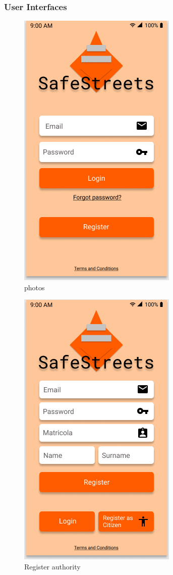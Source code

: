 \documentclass{article}
\begin{document}
\subsubsection{User Interfaces}
\begin{figure}[h!]
    \centering
    \includegraphics[scale=0.5]{img/mockups/login.png}
    \caption{photos}
\end{figure}

\begin{figure}[h!]
    \centering
    \includegraphics[scale=0.5]{img/mockups/register_authority.png}
    \caption{Register authority}
\end{figure}
\end{document}
